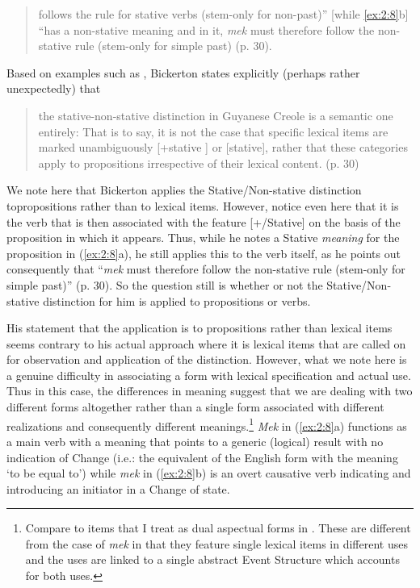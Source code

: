 \begin{quote}
follows the rule for stative verbs (stem-only for non-past)” [while
\ref{ex:2:8}b] “has a non-stative meaning and in it, \textit{mek}
must therefore follow the non-stative rule (stem-only for simple past)
(p. 30).
\end{quote}

Based on examples such as , Bickerton states explicitly
(perhaps rather unexpectedly) that

\begin{quote}
the stative-non-stative distinction in Guyanese Creole is a semantic
one entirely: That is to say, it is not the case that specific lexical
items are marked unambiguously [+stative ] or [\textminus stative], rather that
these categories apply to propositions irrespective of their lexical
content. (p. 30)
\end{quote}

We note here that Bickerton applies the Stative\slash Non-stative
distinction to\linebreak propositions rather than to lexical items.  However,
notice even here that it is the verb that is then associated with the
feature [+/\textminus Stative] on the basis of the proposition in which it
appears.  Thus, while he notes a Stative \textit{meaning} for the
proposition in (\ref{ex:2:8}a), he still applies this to the verb
itself, as he points out consequently that “\textit{mek} must
therefore follow the non-stative rule (stem-only for simple past)”
(p. 30).  So the question still is whether or not the
Stative\slash Non-stative distinction for him is applied to propositions or
verbs.

His statement that the application is to propositions rather than
lexical items seems contrary to his actual approach where it is
lexical items that are called on for observation and application of
the distinction.  However, what we note here is a genuine difficulty
in associating a form with lexical specification and actual use.  Thus
in this case, the differences in meaning suggest that we are dealing
with two different forms altogether rather than a single form
associated with different realizations and consequently different
meanings.\footnote{Compare to items that I treat as dual aspectual
  forms in . These are different from the case of
  \textit{mek} in that they feature single lexical items in different
  uses and the uses are linked to a single abstract Event Structure
  which accounts for both uses.}  \textit{Mek} in (\ref{ex:2:8}a)
functions as a main verb with a meaning that points to a generic
(logical) result with no indication of Change (i.e.: the equivalent of
the English form with the meaning `to be equal to') while \textit{mek}
in (\ref{ex:2:8}b) is an overt causative verb indicating and
introducing an initiator \CAUSE in a Change of state.

